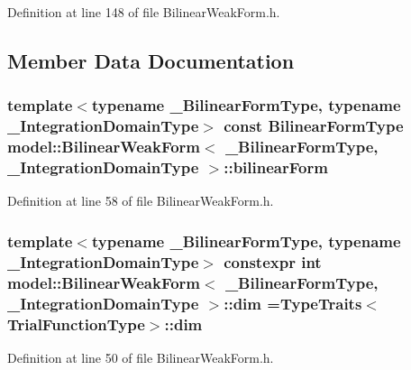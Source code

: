 Definition at line 148 of file Bilinear\+Weak\+Form.\+h.



\subsection{Member Data Documentation}
\hypertarget{structmodel_1_1_bilinear_weak_form_aa5ea33a6280c36cdb36beef41e7cc3f1}{}
\subsubsection[{bilinear\+Form}]{\setlength{\rightskip}{0pt plus 5cm}template$<$typename \+\_\+\+Bilinear\+Form\+Type, typename \+\_\+\+Integration\+Domain\+Type$>$ const {\bf Bilinear\+Form\+Type} {\bf model\+::\+Bilinear\+Weak\+Form}$<$ \+\_\+\+Bilinear\+Form\+Type, \+\_\+\+Integration\+Domain\+Type $>$\+::bilinear\+Form}\label{structmodel_1_1_bilinear_weak_form_aa5ea33a6280c36cdb36beef41e7cc3f1}


Definition at line 58 of file Bilinear\+Weak\+Form.\+h.

\hypertarget{structmodel_1_1_bilinear_weak_form_acd483ad54ba6cad041b458036f50154c}{}
\subsubsection[{dim}]{\setlength{\rightskip}{0pt plus 5cm}template$<$typename \+\_\+\+Bilinear\+Form\+Type, typename \+\_\+\+Integration\+Domain\+Type$>$ constexpr int {\bf model\+::\+Bilinear\+Weak\+Form}$<$ \+\_\+\+Bilinear\+Form\+Type, \+\_\+\+Integration\+Domain\+Type $>$\+::dim ={\bf Type\+Traits}$<${\bf Trial\+Function\+Type}$>$\+::dim\hspace{0.3cm}{\ttfamily [static]}}\label{structmodel_1_1_bilinear_weak_form_acd483ad54ba6cad041b458036f50154c}


Definition at line 50 of file Bilinear\+Weak\+Form.\+h.

\hypertarget{structmodel_1_1_bilinear_weak_form_a4897458848db3e0288687935e991b3e5}{}
